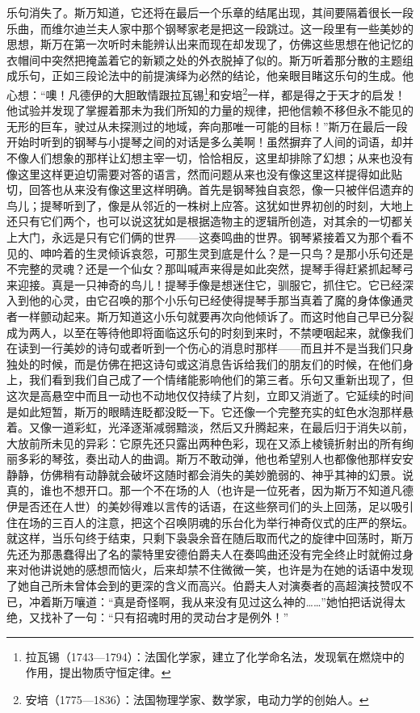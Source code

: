 \par 乐句消失了。斯万知道，它还将在最后一个乐章的结尾出现，其间要隔着很长一段乐曲，而维尔迪兰夫人家中那个钢琴家老是把这一段跳过。这一段里有一些美妙的思想，斯万在第一次听时未能辨认出来而现在却发现了，仿佛这些思想在他记忆的衣帽间中突然把掩盖着它的新颖之处的外衣脱掉了似的。斯万听着那分散的主题组成乐句，正如三段论法中的前提演绎为必然的结论，他亲眼目睹这乐句的生成。他心想：“噢！凡德伊的大胆敢情跟拉瓦锡\footnote{拉瓦锡（1743—1794）：法国化学家，建立了化学命名法，发现氧在燃烧中的作用，提出物质守恒定律。}和安培\footnote{安培（1775—1836）：法国物理学家、数学家，电动力学的创始人。}一样，都是得之于天才的启发！他试验并发现了掌握着那未为我们所知的力量的规律，把他信赖不移但永不能见的无形的巨车，驶过从未探测过的地域，奔向那唯一可能的目标！”斯万在最后一段开始时听到的钢琴与小提琴之间的对话是多么美啊！虽然摒弃了人间的词语，却并不像人们想象的那样让幻想主宰一切，恰恰相反，这里却排除了幻想；从来也没有像这里这样更迫切需要对答的语言，然而问题从来也没有像这里这样提得如此贴切，回答也从来没有像这里这样明确。首先是钢琴独自哀怨，像一只被伴侣遗弃的鸟儿；提琴听到了，像是从邻近的一株树上应答。这犹如世界初创的时刻，大地上还只有它们两个，也可以说这犹如是根据造物主的逻辑所创造，对其余的一切都关上大门，永远是只有它们俩的世界——这奏鸣曲的世界。钢琴紧接着又为那个看不见的、呻吟着的生灵倾诉哀怨，可那生灵到底是什么？是一只鸟？是那小乐句还是不完整的灵魂？还是一个仙女？那叫喊声来得是如此突然，提琴手得赶紧抓起琴弓来迎接。真是一只神奇的鸟儿！提琴手像是想迷住它，驯服它，抓住它。它已经深入到他的心灵，由它召唤的那个小乐句已经使得提琴手那当真着了魔的身体像通灵者一样颤动起来。斯万知道这小乐句就要再次向他倾诉了。而这时他自己早已分裂成为两人，以至在等待他即将面临这乐句的时刻到来时，不禁哽咽起来，就像我们在读到一行美妙的诗句或者听到一个伤心的消息时那样——而且并不是当我们只身独处的时候，而是仿佛在把这诗句或这消息告诉给我们的朋友们的时候，在他们身上，我们看到我们自己成了一个情绪能影响他们的第三者。乐句又重新出现了，但这次是高悬空中而且一动也不动地仅仅持续了片刻，立即又消逝了。它延续的时间是如此短暂，斯万的眼睛连眨都没眨一下。它还像一个完整充实的虹色水泡那样悬着。又像一道彩虹，光泽逐渐减弱黯淡，然后又升腾起来，在最后归于消失以前，大放前所未见的异彩：它原先还只露出两种色彩，现在又添上棱镜折射出的所有绚丽多彩的琴弦，奏出动人的曲调。斯万不敢动弹，他也希望别人也都像他那样安安静静，仿佛稍有动静就会破坏这随时都会消失的美妙脆弱的、神乎其神的幻景。说真的，谁也不想开口。那一个不在场的人（也许是一位死者，因为斯万不知道凡德伊是否还在人世）的美妙得难以言传的话语，在这些祭司们的头上回荡，足以吸引住在场的三百人的注意，把这个召唤阴魂的乐台化为举行神奇仪式的庄严的祭坛。就这样，当乐句终于结束，只剩下袅袅余音在随后取而代之的旋律中回荡时，斯万先还为那愚蠢得出了名的蒙特里安德伯爵夫人在奏鸣曲还没有完全终止时就俯过身来对他讲说她的感想而恼火，后来却禁不住微微一笑，也许是为在她的话语中发现了她自己所未曾体会到的更深的含义而高兴。伯爵夫人对演奏者的高超演技赞叹不已，冲着斯万嚷道：“真是奇怪啊，我从来没有见过这么神的……”她怕把话说得太绝，又找补了一句：“只有招魂时用的灵动台才是例外！”
